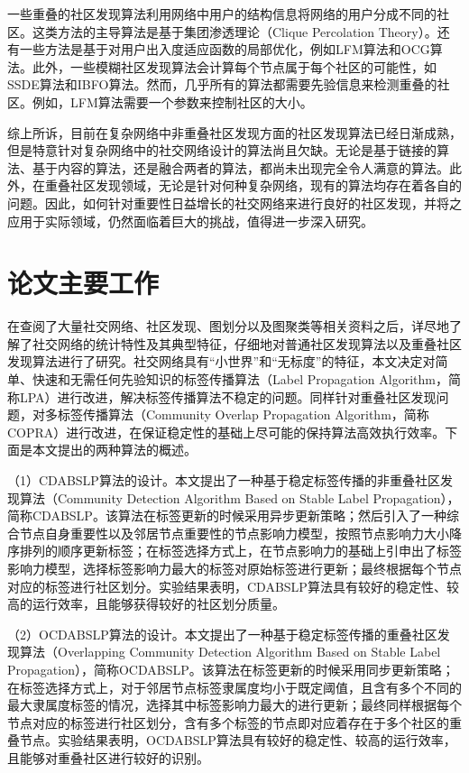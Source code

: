 一些重叠的社区发现算法利用网络中用户的结构信息将网络的用户分成不同的社区。这类方法的主导算法是基于集团渗透理论（Clique Percolation Theory）\cite{Palla2005Uncovering}。还有一些方法是基于对用户出入度适应函数的局部优化，例如LFM算法\cite{Lancichinetti2012Detecting}和OCG算法\cite{Becker2012Multifunctional}。此外，一些模糊社区发现算法会计算每个节点属于每个社区的可能性，如SSDE算法\cite{Magdon2010SSDE}和IBFO算法\cite{Lei2013Clustering}。然而，几乎所有的算法都需要先验信息来检测重叠的社区。例如，LFM算法需要一个参数来控制社区的大小。

综上所诉，目前在复杂网络中非重叠社区发现方面的社区发现算法已经日渐成熟，但是特意针对复杂网络中的社交网络设计的算法尚且欠缺。无论是基于链接的算法、基于内容的算法，还是融合两者的算法，都尚未出现完全令人满意的算法。此外，在重叠社区发现领域，无论是针对何种复杂网络，现有的算法均存在着各自的问题。因此，如何针对重要性日益增长的社交网络来进行良好的社区发现，并将之应用于实际领域，仍然面临着巨大的挑战，值得进一步深入研究。

\section{论文主要工作}

在查阅了大量社交网络、社区发现、图划分以及图聚类等相关资料之后，详尽地了解了社交网络的统计特性及其典型特征，仔细地对普通社区发现算法以及重叠社区发现算法进行了研究。社交网络具有“小世界”和“无标度”的特征，本文决定对简单、快速和无需任何先验知识的标签传播算法（Label Propagation Algorithm，简称LPA）进行改进，解决标签传播算法不稳定的问题。同样针对重叠社区发现问题，对多标签传播算法（Community Overlap Propagation Algorithm，简称COPRA）进行改进，在保证稳定性的基础上尽可能的保持算法高效执行效率。下面是本文提出的两种算法的概述。

（1）CDABSLP算法的设计。本文提出了一种基于稳定标签传播的非重叠社区发现算法（Community Detection Algorithm Based on Stable Label Propagation），简称CDABSLP。该算法在标签更新的时候采用异步更新策略；然后引入了一种综合节点自身重要性以及邻居节点重要性的节点影响力模型，按照节点影响力大小降序排列的顺序更新标签；在标签选择方式上，在节点影响力的基础上引申出了标签影响力模型，选择标签影响力最大的标签对原始标签进行更新；最终根据每个节点对应的标签进行社区划分。实验结果表明，CDABSLP算法具有较好的稳定性、较高的运行效率，且能够获得较好的社区划分质量。

（2）OCDABSLP算法的设计。本文提出了一种基于稳定标签传播的重叠社区发现算法（Overlapping Community Detection Algorithm Based on Stable Label Propagation），简称OCDABSLP。该算法在标签更新的时候采用同步更新策略；在标签选择方式上，对于邻居节点标签隶属度均小于既定阈值，且含有多个不同的最大隶属度标签的情况，选择其中标签影响力最大的进行更新；最终同样根据每个节点对应的标签进行社区划分，含有多个标签的节点即对应着存在于多个社区的重叠节点。实验结果表明，OCDABSLP算法具有较好的稳定性、较高的运行效率，且能够对重叠社区进行较好的识别。


